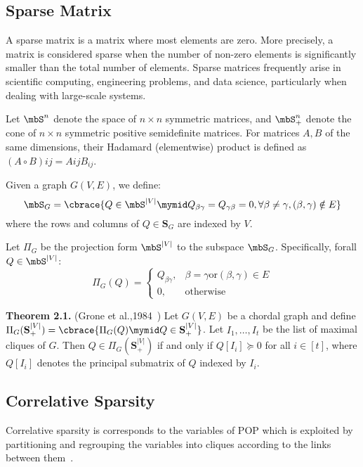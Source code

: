 \subsection{Sparse Matrix}

A sparse matrix is a matrix where most elements are zero. More precisely, a matrix is considered sparse when the number of non-zero elements is significantly smaller than the total number of elements. Sparse matrices frequently arise in scientific computing, engineering problems, and data science, particularly when dealing with large-scale systems.

Let $\mbS^n$ denote the space of $n \times n$ symmetric matrices, and $\mbS^n_+$ denote the cone of $n \times n$ symmetric positive semidefinite matrices. For matrices $A, B$ of the same dimensions, their Hadamard (elementwise) product is defined as $(A \circ B){ij} = A{ij}B_{ij}$.

Given a graph $G(V, E)$, we define:
\begin{equation*}
\mbS_G = \cbrace{Q\in \mbS^{|V|}\mymid Q_{\beta\gamma} = Q_{\gamma\beta} = 0, \forall \beta\ne\gamma, (\beta, \gamma)\notin E}
\end{equation*}
where the rows and columns of $Q \in \mathbf{S}_G$ are indexed by $V$.

Let $\Pi_G$ be the projection form $\mbS^{|V|}$ to the subspace $\mbS_G$. Specifically, forall $Q\in \mbS^{|V|}$:
\begin{equation}
	\Pi_G(Q) = \begin{cases}
		Q_{\beta\gamma}, & \beta = \gamma \text{or} (\beta, \gamma)\in E\\
		0, & \text{otherwise}
	\end{cases}
\end{equation}

\textbf{Theorem 2.1.} (Grone et al.,1984~\cite{Grone1984lina-positive-definite})
Let $G(V, E)$ be a chordal graph and define $\Pi_G(\mathbf{S}^{|V|}_+) = \cbrace{\Pi_G(Q) \mymid Q \in \mathbf{S}^{|V|}_+}$. Let $I_1, \ldots, I_t$ be the list of maximal cliques of $G$. Then $Q \in \Pi_G(\mathbf{S}^{|V|}_+)$ if and only if $Q[I_i] \succeq 0$ for all $i\in[t]$, where $Q[I_i]$ denotes the principal submatrix of $Q$ indexed by $I_i$.

\subsection{Correlative Sparsity}
Correlative sparsity is corresponds to the variables of POP which is exploited by partitioning and regrouping the variables into cliques according to the links between them~\cite{Waki2006siam-sos-semidefinite-relaxation}.

